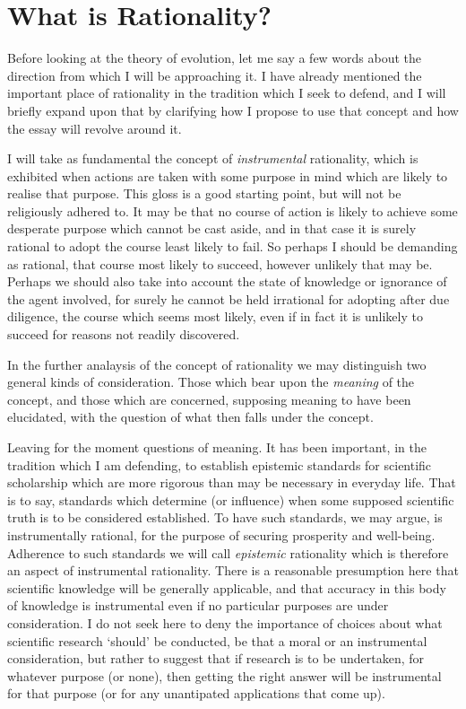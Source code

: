 \documentclass[10pt,titlepage]{book}
\begin{document}
\section{What is Rationality?}

Before looking at the theory of evolution, let me say a few words about the direction from which I will be approaching it.
I have already mentioned the important place of rationality in the tradition which I seek to defend, and I will briefly expand upon that by clarifying how I propose to use that concept and how the essay will revolve around it.

I will take as fundamental the concept of \emph{instrumental} rationality, which is exhibited when actions are taken with some purpose in mind which are likely to realise that purpose.
This gloss is a good starting point, but will not be religiously adhered to.
It may be that no course of action is likely to achieve some desperate purpose which cannot be cast aside, and in that case it is surely rational to adopt the course least likely to fail.
So perhaps I should be demanding as rational, that course most likely to succeed, however unlikely that may be.
Perhaps we should also take into account the state of knowledge or ignorance of the agent involved, for surely he cannot be held irrational for adopting after due diligence, the course which seems most likely, even if in fact it is unlikely to succeed for reasons not readily discovered.

In the further analaysis of the concept of rationality we may distinguish two general kinds of consideration.
Those which bear upon the \emph{meaning} of the concept, and those which are concerned, supposing meaning to have been elucidated, with the question of what then falls under the concept.

Leaving for the moment questions of meaning.
It has been important, in the tradition which I am defending, to establish epistemic standards for scientific scholarship which are more rigorous than may be necessary in everyday life.
That is to say, standards which determine (or influence) when some supposed scientific truth is to be considered established.
To have such standards, we may argue, is instrumentally rational, for the purpose of securing prosperity and well-being.
Adherence to such standards we will call \emph{epistemic} rationality which is therefore an aspect of instrumental rationality.
There is a reasonable presumption here that scientific knowledge will be generally applicable, and that accuracy in this body of knowledge is instrumental even if no particular purposes are under consideration.
I do not seek here to deny the importance of choices about what scientific research `should' be conducted, be that a moral or an instrumental consideration, but rather to suggest that if research is to be undertaken, for whatever purpose (or none), then getting the right answer will be instrumental for that purpose (or for any unantipated applications that come up).
\end{document}
